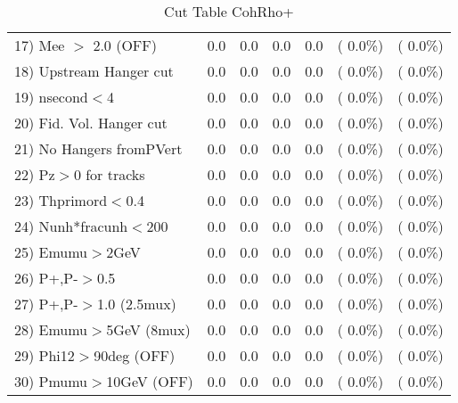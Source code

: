 \begin{table}[h!]
\begin{tabular}{||l||r|r|r|r|r|r||}
 17) Mee $>$ 2.0  (OFF)   &          0.0 &          0.0 &          0.0 &          0.0 & (  0.0\%) & (  0.0\%) \\
 18) Upstream Hanger cut  &          0.0 &          0.0 &          0.0 &          0.0 & (  0.0\%) & (  0.0\%) \\
 19) nsecond$<$4          &          0.0 &          0.0 &          0.0 &          0.0 & (  0.0\%) & (  0.0\%) \\
 20) Fid. Vol. Hanger cut &          0.0 &          0.0 &          0.0 &          0.0 & (  0.0\%) & (  0.0\%) \\
 21) No Hangers fromPVert &          0.0 &          0.0 &          0.0 &          0.0 & (  0.0\%) & (  0.0\%) \\
 22) Pz$>$0 for tracks    &          0.0 &          0.0 &          0.0 &          0.0 & (  0.0\%) & (  0.0\%) \\
 23) Thprimord$<$0.4      &          0.0 &          0.0 &          0.0 &          0.0 & (  0.0\%) & (  0.0\%) \\
 24) Nunh*fracunh$<$200   &          0.0 &          0.0 &          0.0 &          0.0 & (  0.0\%) & (  0.0\%) \\
 25) Emumu$>$2GeV         &          0.0 &          0.0 &          0.0 &          0.0 & (  0.0\%) & (  0.0\%) \\
 26) P+,P-$>$0.5          &          0.0 &          0.0 &          0.0 &          0.0 & (  0.0\%) & (  0.0\%) \\
 27) P+,P-$>$1.0 (2.5mux) &          0.0 &          0.0 &          0.0 &          0.0 & (  0.0\%) & (  0.0\%) \\
 28) Emumu$>$5GeV  (8mux) &          0.0 &          0.0 &          0.0 &          0.0 & (  0.0\%) & (  0.0\%) \\
 29) Phi12$>$90deg  (OFF) &          0.0 &          0.0 &          0.0 &          0.0 & (  0.0\%) & (  0.0\%) \\
 30) Pmumu$>$10GeV  (OFF) &          0.0 &          0.0 &          0.0 &          0.0 & (  0.0\%) & (  0.0\%) \\
 \hline
 \hline
 \end{tabular}
 \caption{Cut Table  CohRho+  }
 \label{tab-cutcohjpsi-mumu_anumunc}
 \end{table}
